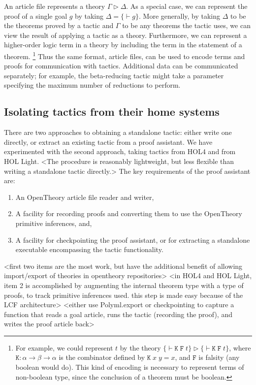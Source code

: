 \documentclass{llncs}
\newcommand{\OpenTheory}{OpenTheory\xspace}
\begin{document}
An article file represents a theory $\Gamma\rhd\Delta$.
As a special case, we can represent the proof of a single goal $g$ by taking $\Delta=\{\vdash g\}$.
More generally, by taking $\Delta$ to be the theorems proved by a tactic and $\Gamma$ to be any theorems the tactic uses, we can view the result of applying a tactic as a theory.
Furthermore, we can represent a higher-order logic term in a theory by including the term in the statement of a theorem. \footnote{For example, we could represent $t$ by the theory $\{\vdash\mathtt{K\;F\;}t\}\rhd\{\vdash\mathtt{K\;F\;}t\}$, where $\mathtt{K}:\alpha\to\beta\to\alpha$ is the combinator defined by $\mathtt{K}\;x\;y=x$, and $\mathtt{F}$ is falsity (any boolean would do).
This kind of encoding is necessary to represent terms of non-boolean type, since the conclusion of a theorem must be boolean.}
Thus the same format, article files, can be used to encode terms and proofs for communication with tactics.
Additional data can be communicated separately; for example, the beta-reducing tactic might take a parameter specifying the maximum number of reductions to perform.

\subsection{Isolating tactics from their home systems}
There are two approaches to obtaining a standalone tactic: either write one directly, or extract an existing tactic from a proof assistant. 
We have experimented with the second approach, taking tactics from HOL4 and from HOL Light.
<The procedure is reasonably lightweight, but less flexible than writing a standalone tactic directly.>
The key requirements of the proof assistant are:
\begin{enumerate}
\item
An \OpenTheory article file reader and writer,
\item
A facility for recording proofs and converting them to use the \OpenTheory primitive inferences, and,
\item
A facility for checkpointing the proof assistant, or for extracting a standalone executable encompassing the tactic functionality.
\end{enumerate}
<first two items are the most work, but have the additional benefit of allowing import/export of theories in opentheory repositories>
<in HOL4 and HOL Light, item 2 is accomplished by augmenting the internal theorem type with a type of proofs, to track primitive inferences used. this step is made easy because of the LCF architecture>
<either use Polyml.export or checkpointing to capture a function that reads a goal article, runs the tactic (recording the proof), and writes the proof article back>
\end{document}
